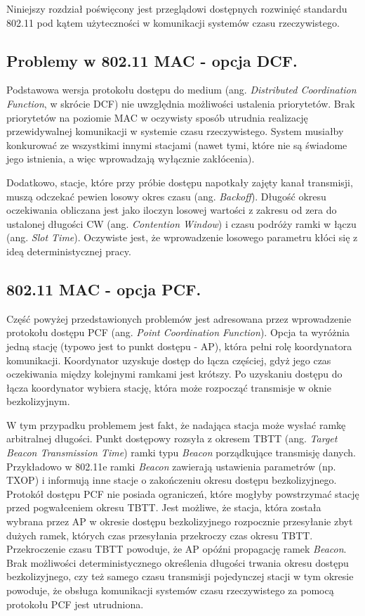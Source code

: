 Niniejszy rozdział poświęcony jest przeglądowi dostępnych rozwinięć standardu 802.11 pod kątem użyteczności w komunikacji systemów czasu rzeczywistego.

\subsection{Problemy w 802.11 MAC - opcja DCF.}

Podstawowa wersja protokołu dostępu do medium (ang. \emph{Distributed Coordination Function}, w skrócie DCF) nie uwzględnia możliwości ustalenia priorytetów. Brak priorytetów na poziomie MAC w oczywisty sposób utrudnia realizację przewidywalnej komunikacji w systemie czasu rzeczywistego. System musiałby konkurować ze wszystkimi innymi stacjami (nawet tymi, które nie są świadome jego istnienia, a więc wprowadzają wyłącznie zakłócenia). 

Dodatkowo, stacje, które przy próbie dostępu napotkały zajęty kanał transmisji, muszą odczekać pewien losowy okres czasu (ang. \emph{Backoff}). Długość okresu oczekiwania obliczana jest jako iloczyn losowej wartości z zakresu od zera do ustalonej długości CW (ang. \emph{Contention Window}) i czasu podróży ramki w łączu (ang. \emph{Slot Time}). Oczywiste jest, że wprowadzenie losowego parametru kłóci się z ideą deterministycznej pracy.

\subsection{802.11 MAC - opcja PCF.}

Część powyżej przedstawionych problemów jest adresowana przez wprowadzenie protokołu dostępu PCF (ang. \emph{Point Coordination Function}). Opcja ta wyróżnia jedną stację (typowo jest to punkt dostępu - AP), która pełni rolę koordynatora komunikacji. Koordynator uzyskuje dostęp do łącza częściej, gdyż jego czas oczekiwania między kolejnymi ramkami jest krótszy. Po uzyskaniu dostępu do łącza koordynator wybiera stację, która może rozpocząć transmisje w oknie bezkolizyjnym. 

W tym przypadku problemem jest fakt, że nadająca stacja może wysłać ramkę arbitralnej długości. Punkt dostępowy rozsyła z okresem TBTT (ang. \emph{Target Beacon Transmission Time}) ramki typu \emph{Beacon} 
porządkujące transmisję danych. Przykładowo w 802.11e ramki \emph{Beacon} zawierają ustawienia parametrów (np. TXOP) i
informują inne stacje o zakończeniu okresu dostępu bezkolizyjnego.
Protokół dostępu PCF nie posiada ograniczeń, które mogłyby powstrzymać stację przed pogwałceniem okresu TBTT. Jest
możliwe, że stacja, która została wybrana przez AP w okresie dostępu bezkolizyjnego rozpocznie przesyłanie zbyt dużych ramek,
których czas przesyłania przekroczy czas okresu TBTT. Przekroczenie czasu TBTT powoduje, że AP opóźni propagację ramek
\emph{Beacon}. Brak możliwości deterministycznego określenia długości trwania okresu dostępu bezkolizyjnego, czy też samego
czasu transmisji pojedynczej stacji w tym okresie powoduje, że obsługa komunikacji systemów czasu rzeczywistego za pomocą
protokołu PCF jest utrudniona.

